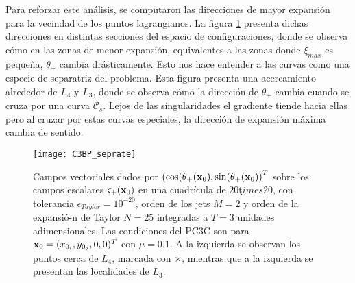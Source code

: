 Para reforzar este análisis, se computaron las direcciones de mayor expansión para la vecindad de los puntos lagrangianos. La figura \ref{fig:C3BP_seprate3} presenta dichas direcciones en distintas secciones del espacio de configuraciones, donde se observa cómo en las zonas de menor expansión, equivalentes a las zonas donde $\xi_{max}$ es pequeña,  $\theta_{+}$ cambia drásticamente. Esto nos hace entender a las curvas como una especie de separatriz del problema. Esta figura presenta una acercamiento alrededor de $L_4$ y $L_3$, donde se observa cómo la dirección de  $\theta_{+}$ cambia cuando se cruza por una curva $\mathcal{C}_s$. Lejos de las singularidades el gradiente tiende hacia ellas pero al cruzar por estas curvas especiales, la dirección de expansión máxima cambia de sentido. 


\begin{figure}
 \centering
 \texttt{[image: C3BP\_seprate]}
 \caption{Campos vectoriales dados por $\left( \cos(\theta_{+}(\mathbf{x}_0), \sin(\theta_{+}(\mathbf{x}_0) \right)^T$ sobre los campos escalares $\varsigma_{+}(\mathbf{x}_0)$ en una cuadrícula de $20 ţimes 20$, con tolerancia $\epsilon_{Taylor} = 10^{-20}$, orden de los jets $M=2$ y orden de la expansió-n de Taylor $N = 25$ integradas a $T = 3$ unidades adimensionales. Las condiciones del PC3C son para $\mathbf{x}_0 = (x_{0_i}, y_{0_j}, 0, 0)^T$ con $\mu = 0.1$. A la izquierda se observan los puntos cerca de $L_4$, marcada con $\times$, mientras que a la izquierda se presentan las localidades de $L_3$.}
 \label{fig:C3BP_seprate3}
\end{figure}






